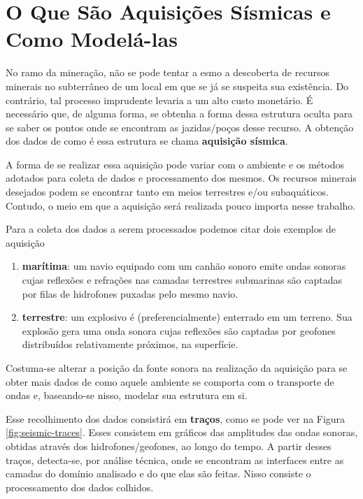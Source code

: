 \section{O Que São Aquisições Sísmicas e Como Modelá-las}

	No ramo da mineração, não se pode tentar a esmo a descoberta de recursos
	minerais no subterrâneo de um local em que se já se suspeita sua existência.
	Do contrário, tal processo imprudente levaria a um alto custo monetário.
	É necessário que, de alguma forma, se obtenha a forma dessa estrutura oculta
	para se saber os pontos onde se encontram as jazidas/poços desse recurso.
	A obtenção dos dados de como é essa estrutura se chama \textbf{aquisição
	sísmica}.

	A forma de se realizar essa aquisição pode variar com o ambiente e os
	métodos adotados para coleta de dados e processamento dos mesmos. Os
	recursos minerais desejados podem se encontrar tanto em meios terrestres
	e/ou subaquáticos. Contudo, o meio em que a aquisição será realizada pouco
	importa nesse trabalho.

	Para a coleta dos dados a serem processados podemos citar dois exemplos
	de aquisição
	\begin{enumerate}
		\item \textbf{marítima}: um navio equipado com um canhão
		sonoro emite ondas sonoras cujas reflexões e refrações nas camadas
		terrestres submarinas são captadas por filas de hidrofones puxadas pelo
		mesmo navio.
		\item \textbf{terrestre}: um explosivo é (preferencialmente) enterrado
		em um terreno. Sua explosão gera uma onda sonora cujas
		reflexões são captadas por geofones distribuídos relativamente próximos,
		na superfície.
	\end{enumerate}
	
	Costuma-se alterar a posição da fonte sonora na realização da aquisição para 
	se obter mais dados de como aquele ambiente se 
	comporta com o transporte de ondas e, baseando-se nisso, modelar sua estrutura 
	em si.

	Esse recolhimento dos dados consistirá em \textbf{traços}, como se pode ver na Figura 
	\ref{fig:seismic-traces}. Esses consistem em gráficos das amplitudes das ondas sonoras, obtidas através dos hidrofones/geofones, ao longo do tempo. 
	A partir desses traços, detecta-se, por análise técnica, onde se 
	encontram as interfaces entre as camadas do domínio analisado e do que elas são feitas. Nisso consiste o processamento dos dados colhidos.

